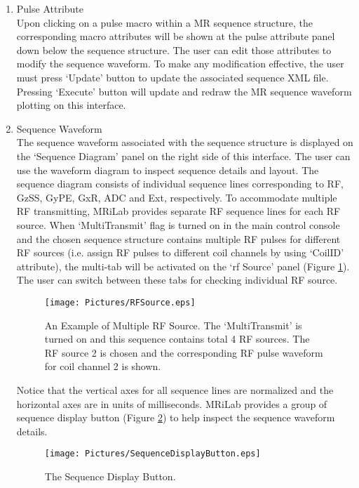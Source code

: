 \documentclass{book}%
\begin{document}
\begin{enumerate}
	\item Pulse Attribute \\
	
Upon clicking on a pulse macro within a MR sequence structure, the corresponding macro attributes will be shown at the pulse attribute panel down below the sequence structure. The user can edit those attributes to modify the sequence waveform. To make any modification effective, the user must press `Update' button to update the associated sequence XML file. Pressing `Execute' button will update and redraw the MR sequence waveform plotting on this interface.
	
	\item Sequence Waveform \\
	
The sequence waveform associated with the sequence structure is displayed on the `Sequence Diagram' panel on the right side of this interface. The user can use the waveform diagram to inspect sequence details and layout. The sequence diagram consists of individual sequence lines corresponding to RF, GzSS, GyPE, GxR, ADC and Ext, respectively. To accommodate multiple RF transmitting, MRiLab provides separate RF sequence lines for each RF source. When `MultiTransmit' flag is turned on in the main control console and the chosen sequence structure contains multiple RF pulses for different RF sources (i.e. assign RF pulses to different coil channels by using `CoilID' attribute), the multi-tab will be activated on the `rf Source' panel (Figure \ref{fig:RFSource}). The user can switch between these tabs for checking individual RF source.\\

\begin{figure}[htbp]
	\centering
		\texttt{[image: Pictures/RFSource.eps]}
	\caption{An Example of Multiple RF Source. The `MultiTransmit' is turned on and this sequence contains total 4 RF sources. The RF source 2 is chosen and the corresponding RF pulse waveform for coil channel 2 is shown.}
	\label{fig:RFSource}
\end{figure}

Notice that the vertical axes for all sequence lines are normalized and the horizontal axes are in units of milliseconds. MRiLab provides a group of sequence display button (Figure \ref{fig:SequenceDisplayButton}) to help inspect the sequence waveform details.

\begin{figure}[htbp]
	\centering
		\texttt{[image: Pictures/SequenceDisplayButton.eps]}
	\caption{The Sequence Display Button.}
	\label{fig:SequenceDisplayButton}
\end{figure}


\end{enumerate}
\end{document}
